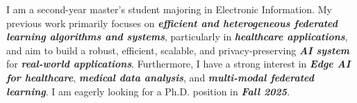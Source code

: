 

\begin{cvparagraph}


I am a second-year master's student majoring in Electronic Information.
My previous work primarily focuses on \textit{\textbf{efficient and heterogeneous federated learning algorithms and systems}}, particularly in \textit{\textbf{healthcare applications}},
and aim to build a robust, efficient, scalable, and privacy-preserving \textit{\textbf{AI system}} for \textit{\textbf{real-world applications}}.
Furthermore, I have a strong interest in \textit{\textbf{Edge AI for healthcare}}, \textit{\textbf{medical data analysis}}, and \textit{\textbf{multi-modal federated learning}}.
I am eagerly looking for a Ph.D. position in \textit{\textbf{Fall 2025}}.


\end{cvparagraph}

